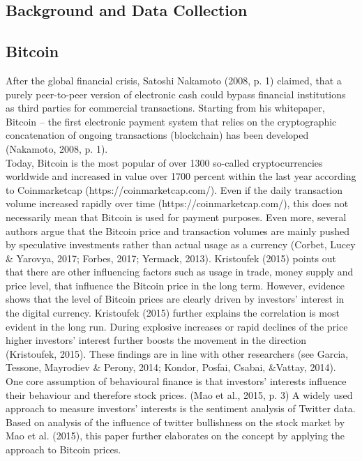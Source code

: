 \documentclass[a4paper,american,12pt]{article}
\begin{document}
\begin{spacing}{1.2}
\clearpage

\section{Background and Data Collection}
\label{sec:Background}
\subsection{Bitcoin}
After the global financial crisis, Satoshi Nakamoto (2008, p. 1) claimed, that a purely peer-to-peer version of electronic cash could bypass financial institutions as third parties for commercial transactions. Starting from his whitepaper, Bitcoin – the first electronic payment system that relies on the cryptographic concatenation of ongoing transactions (blockchain) has been developed (Nakamoto, 2008, p. 1).\\

Today, Bitcoin is the most popular of over 1300 so-called cryptocurrencies worldwide and increased in value over 1700 percent within the last year according to Coinmarketcap (https://coinmarketcap.com/). Even if the daily transaction volume increased rapidly over time (https://coinmarketcap.com/), this does not necessarily mean that Bitcoin is used for payment purposes. Even more, several authors argue that the Bitcoin price and transaction volumes are mainly pushed by speculative investments rather than actual usage as a currency (Corbet, Lucey \& Yarovya, 2017; Forbes, 2017; Yermack, 2013). Kristoufek (2015) points out that there are other influencing factors such as usage in trade, money supply and price level, that influence the Bitcoin price in the long term. However, evidence shows that the level of Bitcoin prices are clearly driven by investors’ interest in the digital currency. Kristoufek (2015) further explains the correlation is most evident in the long run.  During explosive increases or rapid declines of the price higher investors’ interest further boosts the movement in the direction (Kristoufek, 2015). These findings are in line with other researchers (see Garcia, Tessone, Mayrodiev \& Perony, 2014; Kondor, Posfai, Csabai, \&Vattay, 2014).\\

One core assumption of behavioural finance is that investors’ interests influence their behaviour and therefore stock prices. (Mao et al., 2015, p. 3) A widely used approach to measure investors’ interests is the sentiment analysis of Twitter data. Based on analysis of the influence of twitter bullishness on the stock market by Mao et al. (2015), this paper further elaborates on the concept by applying the approach to Bitcoin prices.
		

\end{spacing}
\end{document}
